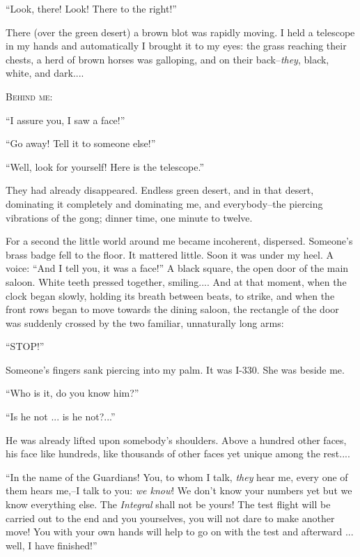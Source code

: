 \documentclass[11pt,openany]{book}
\begin{document}
``Look, there! Look! There to the right!''

There (over the green desert) a brown blot was rapidly moving. I held a telescope in my hands and automatically I brought it to my eyes: the grass reaching their chests, a herd of brown horses was galloping, and on their back--\emph{they}, black, white, and dark....

\begin{center}\textsc{Behind me:}\end{center}

``I assure you, I saw a face!''

``Go away! Tell it to someone else!''

``Well, look for yourself! Here is the telescope.''

They had already disappeared. Endless green desert, and in that desert, dominating it completely and dominating me, and everybody--the piercing vibrations of the gong; dinner time, one minute to twelve.

For a second the little world around me became incoherent, dispersed. Someone's brass badge fell to the floor. It mattered little. Soon it was under my heel. A voice: ``And I tell you, it was a face!'' A black square, the open door of the main saloon. White teeth pressed together, smiling.... And at that moment, when the clock began slowly, holding its breath between beats, to strike, and when the front rows began to move towards the dining saloon, the rectangle of the door was suddenly crossed by the two familiar, unnaturally long arms:

``STOP!''

Someone's fingers sank piercing into my palm. It was I-330. She was beside me.

``Who is it, do you know him?''

``Is he not ... is he not?...''

He was already lifted upon somebody's shoulders. Above a hundred other faces, his face like hundreds, like thousands of other faces yet unique among the rest....

``In the name of the Guardians! You, to whom I talk, \emph{they} hear me, every one of them hears me,--I talk to you: \emph{we know}! We don't know your numbers yet but we know everything else. The \emph{Integral} shall not be yours! The test flight will be carried out to the end and you yourselves, you will not dare to make another move! You with your own hands will help to go on with the test and afterward ... well, I have finished!''
\end{document}
